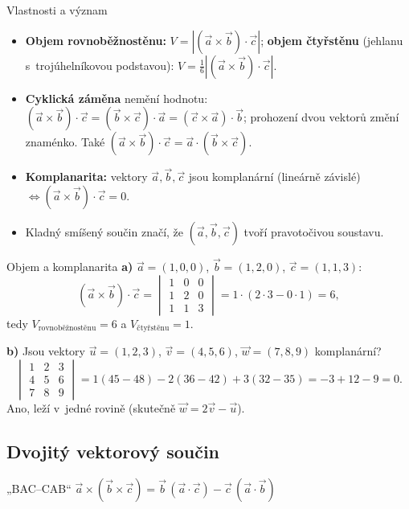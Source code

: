 \documentclass[a4paper,11pt]{article}
\newcommand{\abs}[1]{\left\lvert #1\right\rvert}
\begin{document}
\begin{veta}{Vlastnosti a význam}
\begin{itemize}
  \item \textbf{Objem rovnoběžnostěnu:} $V=\abs{(\vec a\times\vec b)\cdot\vec c}$;
        \textbf{objem čtyřstěnu} (jehlanu s~trojúhelníkovou podstavou):
        $V=\tfrac16\abs{(\vec a\times\vec b)\cdot\vec c}$.
  \item \textbf{Cyklická záměna} nemění hodnotu:
        $(\vec a\times\vec b)\cdot\vec c=(\vec b\times\vec c)\cdot\vec a=(\vec c\times\vec a)\cdot\vec b$;
        prohození dvou vektorů změní znaménko. Také $(\vec a\times\vec b)\cdot\vec c=\vec a\cdot(\vec b\times\vec c)$.
  \item \textbf{Komplanarita:} vektory $\vec a,\vec b,\vec c$ jsou komplanární
        (lineárně závislé) $\iff(\vec a\times\vec b)\cdot\vec c=0$.
  \item Kladný smíšený součin značí, že $(\vec a,\vec b,\vec c)$ tvoří pravotočivou soustavu.
\end{itemize}
\end{veta}

\begin{priklad}{Objem a komplanarita}
\textbf{a)} $\vec a=(1,0,0)$, $\vec b=(1,2,0)$, $\vec c=(1,1,3)$:
\[
  (\vec a\times\vec b)\cdot\vec c=
  \begin{vmatrix}1&0&0\\1&2&0\\1&1&3\end{vmatrix}=1\cdot(2\cdot3-0\cdot1)=6,
\]
tedy $V_{\text{rovnoběžnostěnu}}=6$ a $V_{\text{čtyřstěnu}}=1$.

\smallskip\noindent
\textbf{b)} Jsou vektory $\vec u=(1,2,3)$, $\vec v=(4,5,6)$, $\vec w=(7,8,9)$ komplanární?
\[
  \begin{vmatrix}1&2&3\\4&5&6\\7&8&9\end{vmatrix}
  =1(45-48)-2(36-42)+3(32-35)=-3+12-9=0 .
\]
Ano, leží v~jedné rovině (skutečně $\vec w=2\vec v-\vec u$).
\end{priklad}

\subsection{Dvojitý vektorový součin}

\begin{veta}{„BAC--CAB“}
$\vec a\times(\vec b\times\vec c)=\vec b\,(\vec a\cdot\vec c)-\vec c\,(\vec a\cdot\vec b)$
\end{veta}
\end{document}
